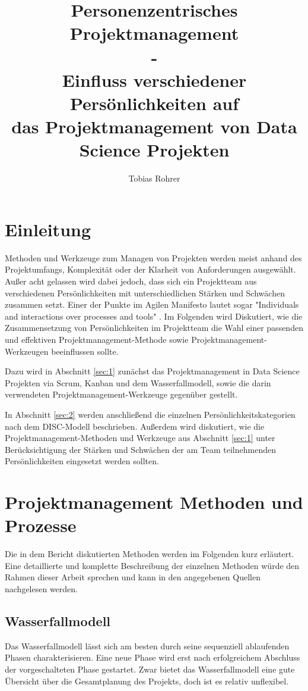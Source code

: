 \documentclass[twocolumn,10pt]{asme2ej}
\title{%
	Personenzentrisches Projektmanagement\\
	\large 
	- \\
	Einfluss verschiedener Persönlichkeiten auf \\ 
	das Projektmanagement von Data Science Projekten}
\author{Tobias Rohrer
    \affiliation{
	Hochschule Darmstadt\\
	Data Science (Master)\\
    Email: sttorohr@stud.h-da.de
    }	
}
\begin{document}
\maketitle    

\begin{abstract}


\end{abstract}

\section{Einleitung}
Methoden und Werkzeuge zum Managen von Projekten werden meist anhand des Projektumfangs, Komplexität oder der Klarheit von Anforderungen ausgewählt. Außer acht gelassen wird dabei jedoch, dass sich ein Projektteam aus verschiedenen Persönlichkeiten mit unterschiedlichen Stärken und Schwächen zusammen setzt. Einer der Punkte im Agilen Manifesto lautet sogar "Individuals and interactions over processes and tools" \cite{beck2001agile}. Im Folgenden wird Diskutiert, wie die Zusammensetzung von Persönlichkeiten im Projektteam die Wahl einer passenden und effektiven Projektmanagement-Methode sowie Projektmanagement-Werkzeugen beeinflussen sollte.

Dazu wird in Abschnitt \ref{sec:1} zunächst das Projektmanagement in Data Science Projekten via Scrum, Kanban und dem Wasserfallmodell, sowie die darin verwendeten Projektmanagement-Werkzeuge gegenüber gestellt.

In Abschnitt \ref{sec:2} werden anschließend die einzelnen Persönlichkeitskategorien nach dem DISC-Modell beschrieben. Außerdem wird diskutiert, wie die Projektmanagement-Methoden und Werkzeuge aus Abschnitt \ref{sec:1} unter Berücksichtigung der Stärken und Schwächen der am Team teilnehmenden Persönlichkeiten eingesetzt werden sollten.


\section{Projektmanagement Methoden und Prozesse}
Die in dem Bericht diskutierten Methoden werden im Folgenden kurz erläutert. Eine detaillierte und komplette Beschreibung der einzelnen Methoden würde den Rahmen dieser Arbeit sprechen und kann in den angegebenen Quellen nachgelesen werden.

\subsection{Wasserfallmodell}
Das Wasserfallmodell lässt sich am besten durch seine sequenziell ablaufenden Phasen charakterisieren. Eine neue Phase wird erst nach erfolgreichem Abschluss der vorgeschalteten Phase gestartet. Zwar bietet das Wasserfallmodell eine gute Übersicht über die Gesamtplanung des Projekts, doch ist es relativ unflexibel.
\end{document}
